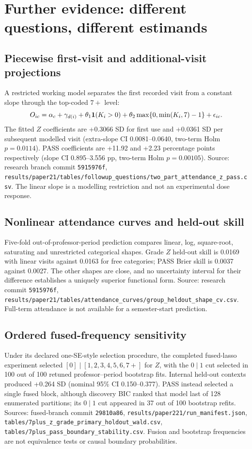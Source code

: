 
\section{Further evidence: different questions, different estimands}
\subsection{Piecewise first-visit and additional-visit projections}
A restricted working model separates the first recorded visit from a constant slope through the top-coded $7+$ level:
\[
O_{ic}=\alpha_c+\gamma_{d(i)}+\theta_1{\bf1}(K_i>0)+\theta_2\max\{0,\min(K_i,7)-1\}+\epsilon_{ic}.
\]
The fitted $Z$ coefficients are +0.3066 SD for first use and +0.0361 SD per subsequent modelled visit (extra-slope CI 0.0081--0.0640, two-term Holm $p=0.0114$). PASS coefficients are +11.92 and +2.23 percentage points respectively (slope CI 0.895--3.556 pp, two-term Holm $p=0.00105$). Source: research branch commit \texttt{5915976f}, \texttt{results/paper21/tables/followup\_questions/two\_part\_attendance\_z\_pass.csv}. The linear slope is a modelling restriction and not an experimental dose response.

\subsection{Nonlinear attendance curves and held-out skill}
Five-fold out-of-professor-period prediction compares linear, log, square-root, saturating and unrestricted categorical shapes. Grade $Z$ held-out skill is 0.0169 with linear visits against 0.0163 for free categories; PASS Brier skill is 0.0037 against 0.0027. The other shapes are close, and no uncertainty interval for their difference establishes a uniquely superior functional form. Source: research commit \texttt{5915976f}, \texttt{results/paper21/tables/attendance\_curves/group\_heldout\_shape\_cv.csv}. Full-term attendance is not available for a semester-start prediction.

\subsection{Ordered fused-frequency sensitivity}
Under its declared one-SE-style selection procedure, the completed fused-lasso experiment selected $[0]\mid[1,2,3,4,5,6,7+]$ for $Z$, with the $0\mid1$ cut selected in 100 out of 100 retuned professor--period bootstrap fits. Internal held-out contexts produced +0.264 SD (nominal 95\% CI 0.150--0.377). PASS instead selected a single fused block, although discovery BIC ranked that model last of 128 enumerated partitions; its $0\mid1$ cut appeared in 37 out of 100 bootstrap refits. Sources: fused-branch commit \texttt{29810a86}, \texttt{results/paper221/run\_manifest.json}, \texttt{tables/7plus\_z\_grade\_primary\_holdout\_wald.csv}, \texttt{tables/7plus\_pass\_boundary\_stability.csv}. Fusion and bootstrap frequencies are not equivalence tests or causal boundary probabilities.

